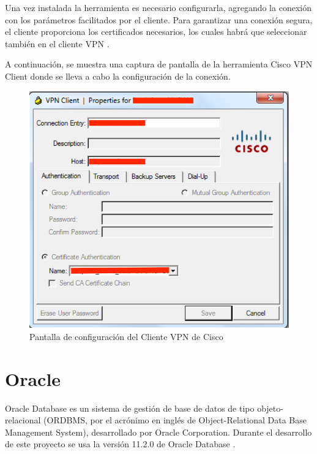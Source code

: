 \documentclass[a4paper, 12pt]{book}
\begin{document}
Una vez instalada la herramienta es necesario configurarla, agregando la conexión con los parámetros facilitados por el cliente. Para garantizar una conexión segura, el cliente proporciona los certificados necesarios, los cuales habrá que seleccionar también en el cliente VPN \cite{deal2005complete}.

A continuación, se muestra una captura de pantalla de la herramienta Cisco VPN Client donde se lleva a cabo la configuración de la conexión.

\begin{figure}
   \centering
   \includegraphics[width=12cm, keepaspectratio]{img/ciscovpnclient}
   \caption{Pantalla de configuración del Cliente VPN de Cisco}
   \label{fig:CiscoVpnClient_Config}
\end{figure}

\section{Oracle}
\label{sec:Oracle}
Oracle Database es un sistema de gestión de base de datos de tipo objeto-relacional (ORDBMS, por el acrónimo en inglés de Object-Relational Data Base Management System), desarrollado por Oracle Corporation. Durante el desarrollo de este proyecto se usa la versión 11.2.0 de Oracle Database \cite{Ashdown_oracle}.
\end{document}
